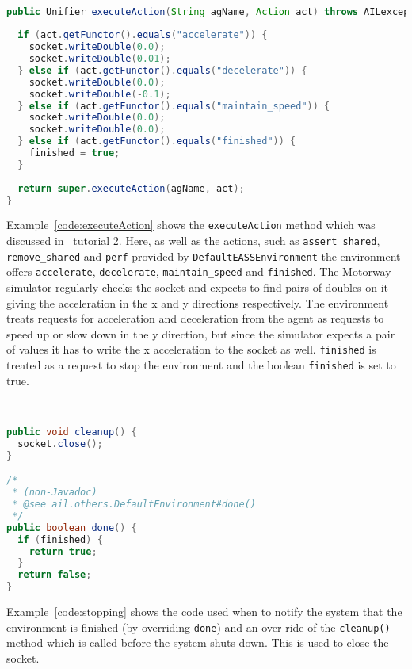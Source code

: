 \begin{ourexample}
\label{code:executeAction} \quad \\
\begin{lstlisting}[basicstyle=\sffamily,language=Java,style=easslisting]
public Unifier executeAction(String agName, Action act) throws AILexception {
		
  if (act.getFunctor().equals("accelerate")) {
    socket.writeDouble(0.0);
    socket.writeDouble(0.01);
  } else if (act.getFunctor().equals("decelerate")) {
    socket.writeDouble(0.0);
    socket.writeDouble(-0.1);
  } else if (act.getFunctor().equals("maintain_speed")) {
    socket.writeDouble(0.0);
    socket.writeDouble(0.0);
  } else if (act.getFunctor().equals("finished")) {
    finished = true;
  }
		
  return super.executeAction(agName, act);
}
\end{lstlisting}
\end{ourexample}
Example~\ref{code:executeAction} shows the \texttt{executeAction} method which was discussed in \ail\ tutorial 2.  Here, as well as the actions, such as \lstinline{assert_shared}, \lstinline{remove_shared} and \lstinline{perf} provided by \texttt{DefaultEASSEnvironment} the environment offers \lstinline{accelerate}, \lstinline{decelerate}, \lstinline{maintain_speed} and \lstinline{finished}.  The Motorway simulator regularly checks the socket and expects to find pairs of doubles on it giving the acceleration in the x and y directions respectively.  The environment treats requests for acceleration and deceleration from the agent as requests to speed up or slow down in the y direction, but since the simulator expects a pair of values it has to write the x acceleration to the socket as well.  \lstinline{finished} is treated as a request to stop the environment and the boolean \texttt{finished} is set to true.

\begin{ourexample}
\label{code:stopping} \quad \\
\begin{lstlisting}[basicstyle=\sffamily,language=Java,style=easslisting]
public void cleanup() {
  socket.close();
}

/*
 * (non-Javadoc)
 * @see ail.others.DefaultEnvironment#done()
 */
public boolean done() {
  if (finished) {
    return true;
  }
  return false;
}
\end{lstlisting}
\end{ourexample}
Example~\ref{code:stopping} shows the code used when to notify the system that the environment is finished (by overriding \texttt{done}) and an over-ride of the \texttt{cleanup()} method which is called before the system shuts down.  This is used to close the socket.


